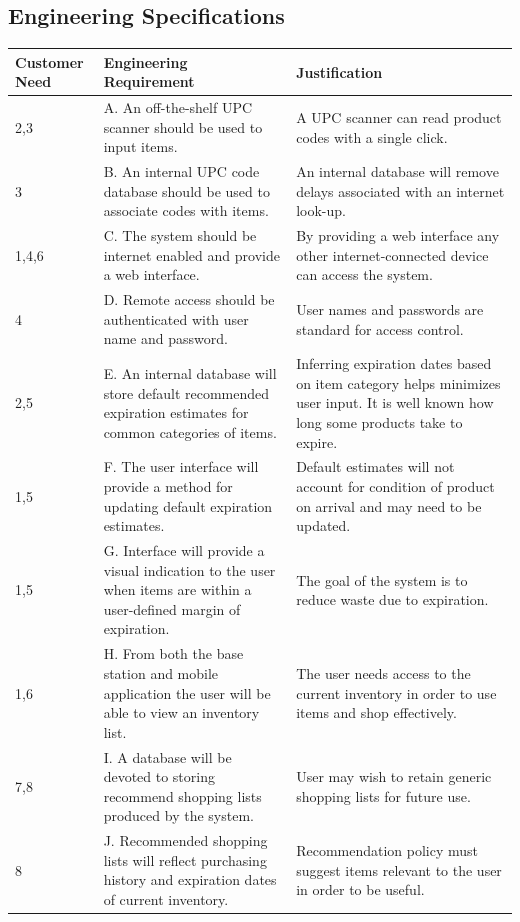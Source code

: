 \documentclass[11pt]{article} %
\begin{document}
\subsection{Engineering Specifications}
\begin{table}[h!]
\begin{center}
\begin{tabular}{| p{1.2in} | p{2.5in} |p{2.5in} |}
\hline
Customer Need & Engineering Requirement & Justification \\
\hline
2,3 &A. An off-the-shelf UPC scanner should be used to input items. & A UPC scanner can read product codes with a single click.\\
\hline
3 &B. An internal UPC code database should be used to associate codes with items.&An internal database will remove delays associated with an internet look-up.\\
\hline
1,4,6&C. The system should be internet enabled and provide a web interface.&By providing a web interface any other internet-connected device can access the system.\\
\hline
4&D. Remote access should be authenticated with user name and password.&User names and passwords are standard for access control.\\
\hline
2,5&E. An internal database will store default recommended expiration estimates for common categories of items.&Inferring expiration dates based on item category helps minimizes user input. It is well known how long some products take to expire.\\
\hline
1,5&F. The user interface will provide a method for updating default expiration estimates.&Default estimates will not account for condition of product on arrival and may need to be updated.\\
\hline
1,5&G. Interface will provide a visual indication to the user when items are within a user-defined margin of expiration.&The goal of the system is to reduce waste due to expiration.\\
\hline
1,6&H. From both the base station and mobile application the user will be able to view an inventory list.&The user needs access to the current inventory in order to use items and shop effectively.\\
\hline
7,8&I. A database will be devoted to storing recommend shopping lists produced by the system.&User may wish to retain generic shopping lists for future use.\\
\hline
8&J. Recommended shopping lists will reflect purchasing history and expiration dates of current inventory.&Recommendation policy must suggest items relevant to the user in order to be useful.\\

\end{tabular}
\end{center}
\end{table}
\end{document}
